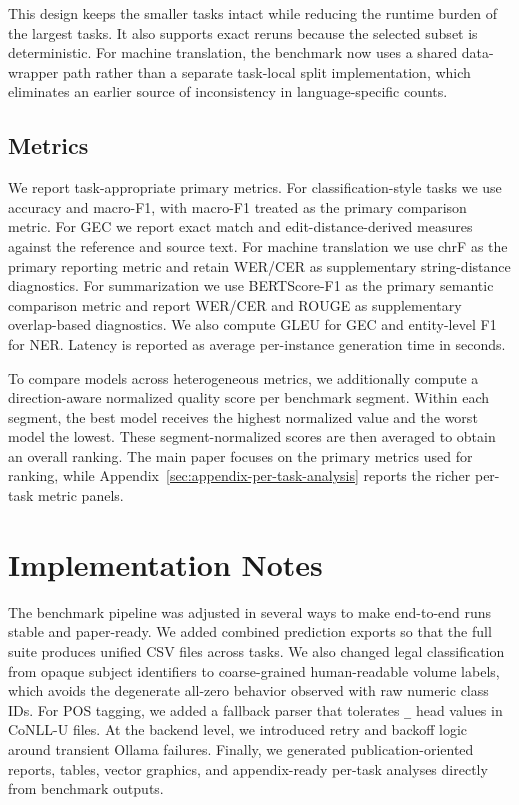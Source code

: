 \documentclass[sigconf,review,anonymous]{acmart}
\begin{document}
This design keeps the smaller tasks intact while reducing the runtime burden of the largest tasks. It also supports exact reruns because the selected subset is deterministic. For machine translation, the benchmark now uses a shared data-wrapper path rather than a separate task-local split implementation, which eliminates an earlier source of inconsistency in language-specific counts.

\subsection{Metrics}
We report task-appropriate primary metrics. For classification-style tasks we use accuracy and macro-F1, with macro-F1 treated as the primary comparison metric. For GEC we report exact match and edit-distance-derived measures against the reference and source text. For machine translation we use chrF as the primary reporting metric and retain WER/CER as supplementary string-distance diagnostics. For summarization we use BERTScore-F1 as the primary semantic comparison metric and report WER/CER and ROUGE as supplementary overlap-based diagnostics. We also compute GLEU for GEC and entity-level F1 for NER. Latency is reported as average per-instance generation time in seconds.

To compare models across heterogeneous metrics, we additionally compute a direction-aware normalized quality score per benchmark segment. Within each segment, the best model receives the highest normalized value and the worst model the lowest. These segment-normalized scores are then averaged to obtain an overall ranking. The main paper focuses on the primary metrics used for ranking, while Appendix~\ref{sec:appendix-per-task-analysis} reports the richer per-task metric panels.

\section{Implementation Notes}
The benchmark pipeline was adjusted in several ways to make end-to-end runs stable and paper-ready. We added combined prediction exports so that the full suite produces unified CSV files across tasks. We also changed legal classification from opaque subject identifiers to coarse-grained human-readable volume labels, which avoids the degenerate all-zero behavior observed with raw numeric class IDs. For POS tagging, we added a fallback parser that tolerates \texttt{\_} head values in CoNLL-U files. At the backend level, we introduced retry and backoff logic around transient Ollama failures. Finally, we generated publication-oriented reports, tables, vector graphics, and appendix-ready per-task analyses directly from benchmark outputs.
\end{document}
